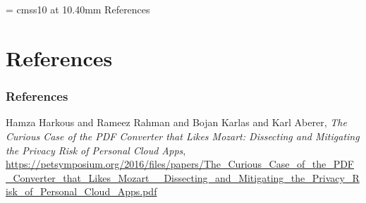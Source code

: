 \documentclass{beamer}
\begin{document}
\appendix

{
\section*{}
	\begin{frame}
      \begin{center}
        \font\endfont = cmss10 at 10.40mm
        \color{darkBlue}
        \endfont 
        \baselineskip 20.0mm
        References
      \end{center}    
\end{frame}
}

\section{References}
\begin{frame}[allowframebreaks]
\frametitle{References}
\small{
\begin{thebibliography}{99} 
  Hamza Harkous and Rameez Rahman and Bojan Karlas and Karl Aberer, \emph{The Curious Case of the PDF Converter that Likes Mozart: Dissecting and Mitigating the Privacy Risk of Personal Cloud Apps}, \url{https://petsymposium.org/2016/files/papers/The\_Curious\_Case\_of\_the\_PDF\_Converter\_that\_Likes\_Mozart\_\_Dissecting\_and\_Mitigating\_the\_Privacy\_Risk\_of\_Personal\_Cloud\_Apps.pdf}
\end{thebibliography}
}
\end{frame}
\end{document}

